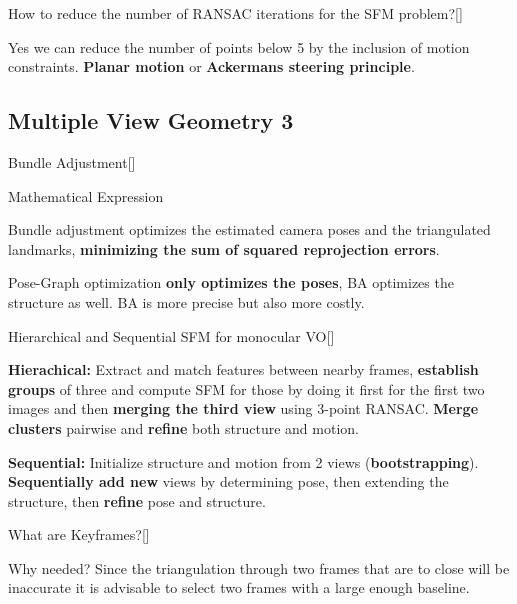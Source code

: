 \documentclass[10pt,a4paper]{scrartcl}
\begin{document}
\begin{multicols*}{2}
\begin{QandA}
{How to reduce the number of RANSAC iterations for the SFM problem?}[\Application]
\item Yes we can reduce the number of points below 5 by the inclusion of motion constraints. \textbf{Planar motion} or \textbf{Ackermans steering principle}.
\end{QandA}

\subsection*{Multiple View Geometry 3}

\begin{QandA}
{Bundle Adjustment}[\Definition]
\item Mathematical Expression

\item Bundle adjustment optimizes the estimated camera poses and the triangulated landmarks, \textbf{minimizing the sum of squared reprojection errors}.
\item Pose-Graph optimization \textbf{only optimizes the poses}, BA optimizes the structure as well. BA is more precise but also more costly.
\end{QandA}

\begin{QandA}
{Hierarchical and Sequential SFM for monocular VO}[\Definition]
\item \textbf{Hierachical:} Extract and match features between nearby frames, \textbf{establish groups} of three and compute SFM for those by doing it first for the first two images and then \textbf{merging the third view} using 3-point RANSAC. \textbf{Merge clusters} pairwise and \textbf{refine} both structure and motion.
\item \textbf{Sequential:} Initialize structure and motion from 2 views (\textbf{bootstrapping}). \textbf{Sequentially add new} views by determining pose, then extending the structure, then \textbf{refine} pose and structure.
\end{QandA}

\begin{QandA}
{What are Keyframes?}[\Definition]
\item Why needed? Since the triangulation through two frames that are to close will be inaccurate it is advisable to select two frames with a large enough baseline.


\end{QandA}
\end{multicols*}
\end{document}
